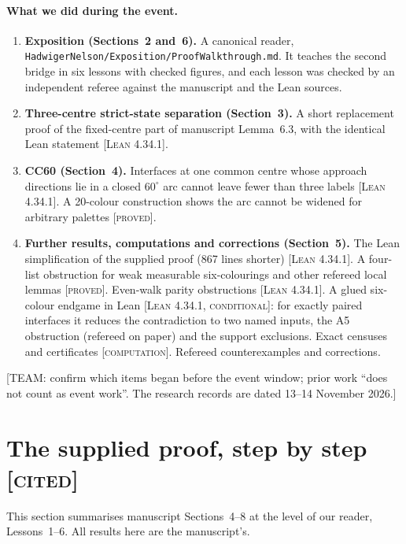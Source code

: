 \documentclass[11pt]{article}
\theoremstyle{definition}
\theoremstyle{remark}
\newcommand{\st}[1]{\textsc{[#1]}}
\begin{document}
\paragraph{What we did during the event.}
\begin{enumerate}
\item \textbf{Exposition (Sections~2 and~6).} A canonical reader, \texttt{Hadwiger\allowbreak{}Nelson/\allowbreak{}Exposition/\allowbreak{}Proof\allowbreak{}Walkthrough.\allowbreak{}md}. It teaches the second bridge in six lessons with checked figures, and each lesson was checked by an independent referee against the manuscript and the Lean sources.
\item \textbf{Three-centre strict-state separation (Section~3).} A short replacement proof of the fixed-centre part of manuscript Lemma~6.3, with the identical Lean statement \st{Lean 4.34.1}.
\item \textbf{CC60 (Section~4).} Interfaces at one common centre whose approach directions lie in a closed $60^\circ$ arc cannot leave fewer than three labels \st{Lean 4.34.1}. A 20-colour construction shows the arc cannot be widened for arbitrary palettes \st{proved}.
\item \textbf{Further results, computations and corrections (Section~5).} The Lean simplification of the supplied proof (867 lines shorter) \st{Lean 4.34.1}. A four-list obstruction for weak measurable six-colourings and other refereed local lemmas \st{proved}. Even-walk parity obstructions \st{Lean 4.34.1}. A glued six-colour endgame in Lean \st{Lean 4.34.1, conditional}: for exactly paired interfaces it reduces the contradiction to two named inputs, the A5 obstruction (refereed on paper) and the support exclusions. Exact censuses and certificates \st{computation}. Refereed counterexamples and corrections.
\end{enumerate}
[TEAM: confirm which items began before the event window; prior work ``does not count as event work''. The research records are dated 13--14 November 2026.]

\section{The supplied proof, step by step \st{cited}}
This section summarises manuscript Sections~4--8 at the level of our reader, Lessons~1--6. All results here are the manuscript's.
\end{document}
